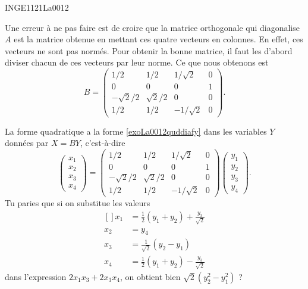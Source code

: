 \begin{corrige}{INGE1121La0012}
\begin{enumerate}
			Une erreur à ne pas faire est de croire que la matrice orthogonale qui diagonalise $A$ est la matrice obtenue en mettant ces quatre vecteurs en colonnes. En effet, ces vecteurs ne sont pas normés. Pour obtenir la bonne matrice, il faut les d'abord diviser chacun de ces vecteurs par leur norme. Ce que nous obtenons est
			\begin{equation}
				B=\begin{pmatrix}
					1/2	&	1/2	&	1/\sqrt{2}	&	0	\\
					 0	&	0	&	0	&	1	\\
					 -\sqrt{2}/2	&	\sqrt{2}/2	&	0	&	0	\\ 
					 1/2	&	1/2	&	-1/\sqrt{2}	&	0	 
				 \end{pmatrix}.
			\end{equation}
			
			La forme quadratique a la forme \eqref{exoLa0012quddiafy} dans les variables $Y$ données par $X=BY$, c'est-à-dire
			\begin{equation}
				\begin{pmatrix}
					x_1	\\ 
					x_2	\\ 
					x_3	\\ 
					x_4	
				\end{pmatrix}=
				\begin{pmatrix}
					1/2	&	1/2	&	1/\sqrt{2}	&	0	\\
					 0	&	0	&	0	&	1	\\
					 -\sqrt{2}/2	&	\sqrt{2}/2	&	0	&	0	\\ 
					 1/2	&	1/2	&	-1/\sqrt{2}	&	0	 
				 \end{pmatrix}
				 \begin{pmatrix}
					 y_1	\\ 
					 y_2	\\ 
					 y_3	\\ 
					 y_4	
				 \end{pmatrix}.
			\end{equation}
			Tu paries que si on substitue les valeurs
			\begin{equation}
				\begin{aligned}[]
					x_1&=\frac{ 1 }{2}(y_1+y_2)+\frac{ y_3 }{ \sqrt{2} }\\
					x_2&=y_4\\
					x_3&=\frac{1}{ \sqrt{2} }(y_2-y_1)\\
					x_4&=\frac{ 1 }{2}(y_1+y_2)-\frac{ y_3 }{ \sqrt{2} }
				\end{aligned}
			\end{equation}
			dans l'expression $2x_1x_3+2x_3x_4$, on obtient bien $\sqrt{2}(y_2^2-y_1^2)$ ?


\end{enumerate}
\end{corrige}
